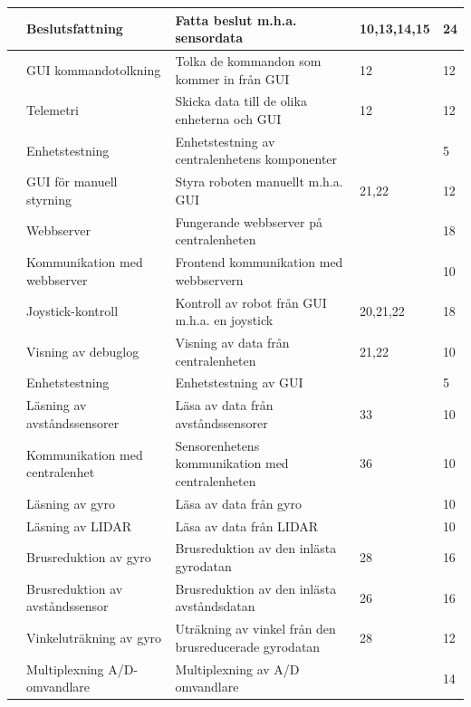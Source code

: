 \documentclass[a4paper,titlepage,12pt]{article}
\newcounter{aktNr}
\newcommand{\nextAktNr}{\stepcounter{aktNr}\arabic{aktNr}}
\begin{document}
\begin{longtable}[c]{ c p{4cm} p{6cm} p{2cm} p{2cm}}
		\nextAktNr{} & Beslutsfattning & Fatta beslut m.h.a. sensordata & 10,13,14,15 & 24 \\ \midrule
		\nextAktNr{} & GUI kommandotolkning & Tolka de kommandon som kommer in från GUI & 12 & 12 \\ \midrule
		\nextAktNr{} & Telemetri & Skicka data till de olika enheterna och GUI & 12 & 12 \\ \midrule
		\nextAktNr{} & Enhetstestning & Enhetstestning av centralenhetens komponenter& & 5 \\ \midrule
		\nextAktNr{} & GUI för manuell styrning & Styra roboten manuellt m.h.a. GUI & 21,22 & 12 \\ \midrule
		\nextAktNr{} & Webbserver & Fungerande webbserver på centralenheten &  & 18 \\ \midrule
		\nextAktNr{} & Kommunikation med webbserver & Frontend kommunikation med webbservern &  & 10 \\ \midrule
		\nextAktNr{} & Joystick-kontroll & Kontroll av robot från GUI m.h.a. en joystick & 20,21,22 & 18 \\ \midrule
		\nextAktNr{} & Visning av debuglog & Visning av data från centralenheten & 21,22 & 10 \\ \midrule
		\nextAktNr{} & Enhetstestning & Enhetstestning av GUI & & 5 \\ \midrule
		\nextAktNr{} & Läsning av avståndssensorer & Läsa av data från avståndssensorer & 33 & 10 \\ \midrule
		\nextAktNr{} & Kommunikation med centralenhet & Sensorenhetens kommunikation
                                                            med centralenheten& 36 & 10 \\ \midrule
		\nextAktNr{} & Läsning av gyro & Läsa av data från gyro & & 10 \\ \midrule
		\nextAktNr{} & Läsning av LIDAR & Läsa av data från LIDAR & & 10 \\ \midrule
		\nextAktNr{} & Brusreduktion av gyro & Brusreduktion av den inlästa gyrodatan & 28 & 16 \\ \midrule
		\nextAktNr{} & Brusreduktion av avståndssensor & Brusreduktion av den
                                                     inlästa avståndsdatan & 26 & 16 \\ \midrule
		\nextAktNr{} & Vinkeluträkning av gyro & Uträkning av vinkel från den
                                             brusreducerade gyrodatan & 28 & 12 \\ \midrule
		\nextAktNr{} & Multiplexning A/D-omvandlare & Multiplexning av A/D omvandlare & & 14 \\ \midrule

\end{longtable}
\end{document}
